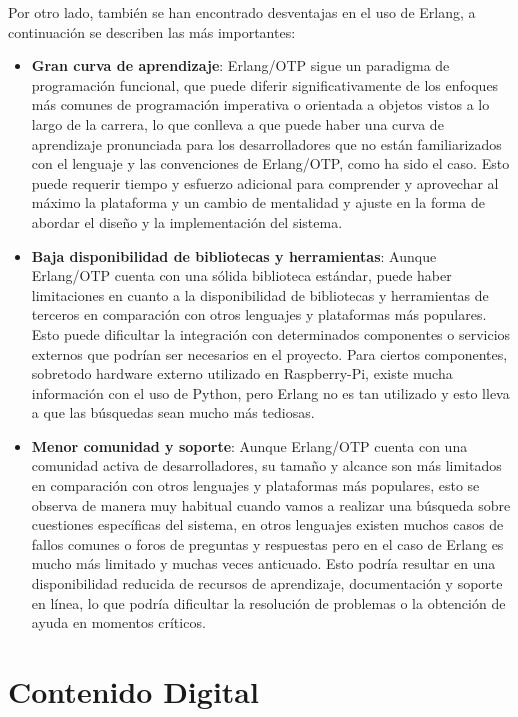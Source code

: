 Por otro lado, también se han encontrado desventajas en el uso de Erlang, a continuación se describen las más importantes:

\begin{itemize}
    \item \textbf{Gran curva de aprendizaje}: Erlang/OTP sigue un paradigma de programación funcional, que puede diferir significativamente de los enfoques más comunes de programación imperativa o orientada a objetos vistos a lo largo de la carrera, lo que conlleva a que puede haber una curva de aprendizaje pronunciada para los desarrolladores que no están familiarizados con el lenguaje y las convenciones de Erlang/OTP, como ha sido el caso. Esto puede requerir tiempo y esfuerzo adicional para comprender y aprovechar al máximo la plataforma y un cambio de mentalidad y ajuste en la forma de abordar el diseño y la implementación del sistema.
    \item \textbf{Baja disponibilidad de bibliotecas y herramientas}: Aunque Erlang/OTP cuenta con una sólida biblioteca estándar, puede haber limitaciones en cuanto a la disponibilidad de bibliotecas y herramientas de terceros en comparación con otros lenguajes y plataformas más populares. Esto puede dificultar la integración con determinados componentes o servicios externos que podrían ser necesarios en el proyecto. Para ciertos componentes, sobretodo hardware externo utilizado en Raspberry-Pi, existe mucha información con el uso de Python, pero Erlang no es tan utilizado y esto lleva a que las búsquedas sean mucho más tediosas.
    
    \item \textbf{Menor comunidad y soporte}: Aunque Erlang/OTP cuenta con una comunidad activa de desarrolladores, su tamaño y alcance son más limitados en comparación con otros lenguajes y plataformas más populares, esto se observa de manera muy habitual cuando vamos a realizar una búsqueda sobre cuestiones específicas del sistema, en otros lenguajes existen muchos casos de fallos comunes o foros de preguntas y respuestas pero en el caso de Erlang es mucho más limitado y muchas veces anticuado. Esto podría resultar en una disponibilidad reducida de recursos de aprendizaje, documentación y soporte en línea, lo que podría dificultar la resolución de problemas o la obtención de ayuda en momentos críticos.
    
\end{itemize}

\appendix

\chapter{Contenido Digital}
